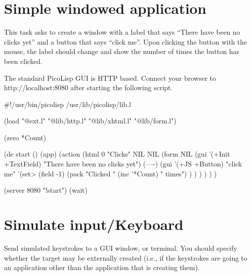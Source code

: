 \pagebreak{}
\section*{Simple windowed application}

This task asks to create a window with a label that says ``There have
been no clicks yet'' and a button that says ``click me''. Upon clicking
the button with the mouse, the label should change and show the number
of times the button has been clicked.

\begin{wideverbatim}

The standard PicoLisp GUI is HTTP based. Connect your browser to
http://localhost:8080 after starting the following script.

#!/usr/bin/picolisp /usr/lib/picolisp/lib.l

(load "@ext.l" "@lib/http.l" "@lib/xhtml.l" "@lib/form.l")

(zero *Count)

(de start ()
   (app)
   (action
      (html 0 "Clicks" NIL NIL
         (form NIL
            (gui '(+Init +TextField) "There have been no clicks yet")
            (----)
            (gui '(+JS +Button) "click me"
               '(set> (field -1)
                  (pack "Clicked " (inc '*Count) " times") ) ) ) ) ) )

(server 8080 "!start")
(wait)

\end{wideverbatim}

\pagebreak{}
\section*{Simulate input/Keyboard}

Send simulated keystrokes to a GUI window, or terminal. You should
specify whether the target may be externally created (i.e., if the
keystrokes are going to an application other than the application that
is creating them).

